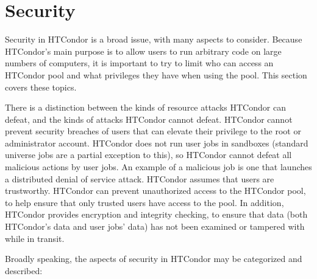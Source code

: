 \section{\label{sec:Security}Security}

Security in HTCondor is a broad issue, with many aspects to consider.
Because HTCondor's main purpose is to allow users to run arbitrary code
on large numbers of computers, it is important to try to limit who can
access an HTCondor pool and what privileges they have when using the
pool.  This section covers these topics.

There is a distinction between the
kinds of resource attacks HTCondor can defeat,
and the kinds of attacks HTCondor cannot defeat.
HTCondor cannot
prevent security breaches of users that can elevate their privilege to
the root or administrator account.
HTCondor does not run user jobs in
sandboxes (standard universe jobs are a partial exception to this),
so HTCondor cannot defeat all malicious actions by user jobs.
An example of a malicious job is
one that launches a distributed denial of service attack.
HTCondor assumes that users are trustworthy.
HTCondor can prevent unauthorized access to the HTCondor pool,
to help ensure that only trusted users have access to the pool.
In addition, HTCondor provides encryption and
integrity checking, to ensure that data (both HTCondor's data and user
jobs' data) has not been examined or tampered with while in transit.

Broadly speaking, the aspects of security in
HTCondor may be categorized and described: 

